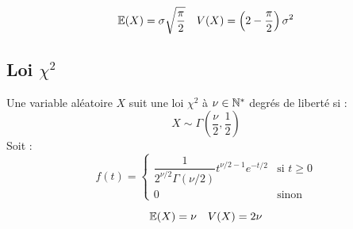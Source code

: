 \begin{proposition}
    \[ \mathbb{E}(X) = \sigma \sqrt{\dfrac{\pi}{2}} \quad V(X) = \left(2 - \dfrac{\pi}{2} \right)\sigma^2 \]
\end{proposition}

\subsection{Loi $\chi^2$}

\begin{definition}
    Une variable aléatoire $X$ suit une loi $\chi^2$ à $\nu \in \mathbb{N}^*$ degrés de liberté si :
        \[ X \sim \Gamma\left(\frac{\nu}{2}, \frac{1}{2}\right) \]
    Soit :
        \[ f(t) = 
            \begin{cases}
                \dfrac{1}{2^{\nu/2} \Gamma(\nu/2)} t^{\nu/2 - 1} e^{-t/2} & \text{si } t \geq 0 \\
                0 & \text{sinon}
            \end{cases} \]
\end{definition}

\begin{proposition}
    \[ \mathbb{E}(X) = \nu \quad V(X) = 2\nu \]
\end{proposition}


